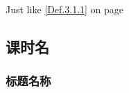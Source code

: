 \documentclass[color=blue]{textbook-cn}%
\newcommand{\inputlogo}[1]{\raisebox{-0.5em}{\texttt{[image: \#1]}}~~}
\begin{document}
\begin{Paracol}
\begin{Definition*}[定义名称]
\lipsum[1][1-3]
\end{Definition*}

Just like \ref{Def.3.1.1} on page \pageref{Def.3.1.1}





\begin{Link}
\zhlipsum
\end{Link}



\lipsum[2]

\begin{Practice}
\lipsum[1][1-5]
\end{Practice}


\subsection{课时名}
\lipsum[3]

\subsubsection{标题名称}
\lipsum[1]

\Example{\inputlogo{LOOK.pdf}\lipsum[1][1-5]}
\Answer{\lipsum[1][1-5]}




\begin{Method}
\lipsum[1][1-8]
\end{Method}



\Example{\inputlogo{LISTEN.pdf}\zhlipsum[1]}
\Answer{\lipsum[1][1-5]}
\Answer*{\lipsum[1][1-5]}

\Variety{\inputlogo{READ.pdf}\lipsum[1][1-5]}
\Answer{\lipsum[1][1-5]}





\begin{Mind}[控制变量]
\lipsum[2]
\end{Mind}




\begin{Display}[向心力]
\lipsum[2]
\lipsum[2]\lipsum[2][1-2]
\end{Display}


\begin{Application}
\lipsum[2]
\lipsum[2]
\end{Application}


\end{Paracol}
\end{document}
